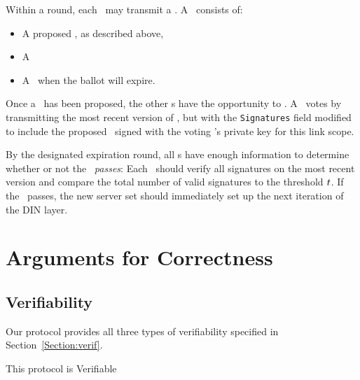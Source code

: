 Within a round, each \KwMember~may  transmit a \KwPetition. A
\KwPetition~consists of:
\begin{itemize}
  \item A proposed \KwManifest, as described above,
  \item A \KwLinkScope{}
  \item A \KwRound~when the ballot will expire.
\end{itemize}

Once a \KwPetition~has been proposed, the other \KwMember s have the
opportunity to \NameVote. A \KwMember~votes by transmitting the most
recent version of \SetVotes, but with the \texttt{Signatures} field
modified to include the proposed \KwManifest~signed with the voting
\KwMember's private key for this link scope.

By the designated expiration round, all \KwMember s have enough
information to determine whether or not the \KwPetition~\emph{passes}:
Each \KwMember~should verify all signatures on the most recent
version
and compare the total number of valid signatures to the threshold $t$. If the
\KwPetition~passes, the new server set should immediately set up the
next iteration of the DIN layer.

\section{Arguments for Correctness}
\subsection{Verifiability}
Our protocol provides all three types of verifiability specified in
Section~\ref{Section:verif}.

\begin{theorem} This protocol is Verifiable\end{theorem}


